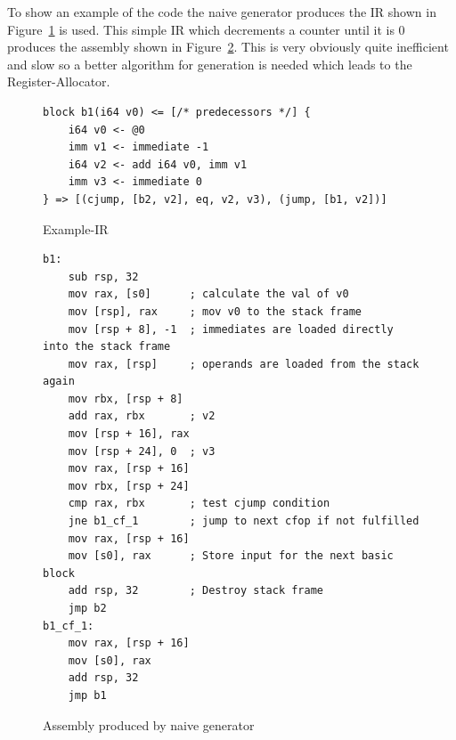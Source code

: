 \documentclass[course=eragp]{aspdoc}
\begin{document}
\par

To show an example of the code the naive generator produces the IR shown in Figure~\ref{fig:example_ir} is used.
This simple IR which decrements a counter until it is 0 produces the assembly shown in Figure~\ref{fig:naive_gen_asm}.
This is very obviously quite inefficient and slow so a better algorithm for generation is needed which leads to the Register-Allocator.
\begin{figure}
    \centering
    \begin{lstlisting}[]
block b1(i64 v0) <= [/* predecessors */] {
    i64 v0 <- @0
    imm v1 <- immediate -1
    i64 v2 <- add i64 v0, imm v1
    imm v3 <- immediate 0
} => [(cjump, [b2, v2], eq, v2, v3), (jump, [b1, v2])]
\end{lstlisting}
    \caption{Example-IR}\label{fig:example_ir}
\end{figure}

\begin{figure}[h]
    \centering
    \begin{lstlisting}[language={[x86masm]Assembler}]
b1:
    sub rsp, 32
    mov rax, [s0]      ; calculate the val of v0
    mov [rsp], rax     ; mov v0 to the stack frame
    mov [rsp + 8], -1  ; immediates are loaded directly into the stack frame
    mov rax, [rsp]     ; operands are loaded from the stack again
    mov rbx, [rsp + 8]
    add rax, rbx       ; v2
    mov [rsp + 16], rax
    mov [rsp + 24], 0  ; v3
    mov rax, [rsp + 16]
    mov rbx, [rsp + 24]
    cmp rax, rbx       ; test cjump condition
    jne b1_cf_1        ; jump to next cfop if not fulfilled
    mov rax, [rsp + 16]
    mov [s0], rax      ; Store input for the next basic block
    add rsp, 32        ; Destroy stack frame
    jmp b2
b1_cf_1:
    mov rax, [rsp + 16]
    mov [s0], rax
    add rsp, 32
    jmp b1
\end{lstlisting}
    \caption{Assembly produced by naive generator}\label{fig:naive_gen_asm}
\end{figure}
\end{document}
